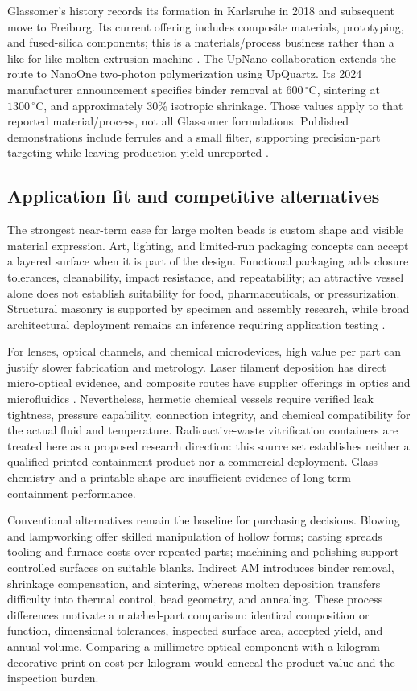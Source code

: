 Glassomer's history records its formation in Karlsruhe in 2018 and subsequent move to Freiburg. Its current offering includes composite materials, prototyping, and fused-silica components; this is a materials/process business rather than a like-for-like molten extrusion machine \cite{com_glassomerhistory,com_glassomer}. The UpNano collaboration extends the route to NanoOne two-photon polymerization using UpQuartz. Its 2024 manufacturer announcement specifies binder removal at $600\,^{\circ}\mathrm{C}$, sintering at $1300\,^{\circ}\mathrm{C}$, and approximately 30\% isotropic shrinkage. Those values apply to that reported material/process, not all Glassomer formulations. Published demonstrations include ferrules and a small filter, supporting precision-part targeting while leaving production yield unreported \cite{com_upnano}.

\subsection{Application fit and competitive alternatives}
The strongest near-term case for large molten beads is custom shape and visible material expression. Art, lighting, and limited-run packaging concepts can accept a layered surface when it is part of the design. Functional packaging adds closure tolerances, cleanability, impact resistance, and repeatability; an attractive vessel alone does not establish suitability for food, pharmaceuticals, or pressurization. Structural masonry is supported by specimen and assembly research, while broad architectural deployment remains an inference requiring application testing \cite{com_masonry}.

For lenses, optical channels, and chemical microdevices, high value per part can justify slower fabrication and metrology. Laser filament deposition has direct micro-optical evidence, and composite routes have supplier offerings in optics and microfluidics \cite{com_liu,com_glassomer}. Nevertheless, hermetic chemical vessels require verified leak tightness, pressure capability, connection integrity, and chemical compatibility for the actual fluid and temperature. Radioactive-waste vitrification containers are treated here as a proposed research direction: this source set establishes neither a qualified printed containment product nor a commercial deployment. Glass chemistry and a printable shape are insufficient evidence of long-term containment performance.

Conventional alternatives remain the baseline for purchasing decisions. Blowing and lampworking offer skilled manipulation of hollow forms; casting spreads tooling and furnace costs over repeated parts; machining and polishing support controlled surfaces on suitable blanks. Indirect AM introduces binder removal, shrinkage compensation, and sintering, whereas molten deposition transfers difficulty into thermal control, bead geometry, and annealing. These process differences motivate a matched-part comparison: identical composition or function, dimensional tolerances, inspected surface area, accepted yield, and annual volume. Comparing a millimetre optical component with a kilogram decorative print on cost per kilogram would conceal the product value and the inspection burden.

